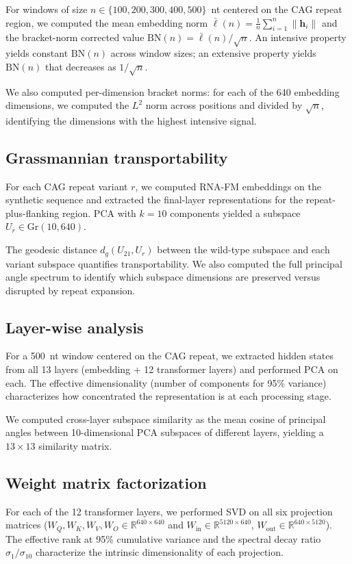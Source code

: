 \documentclass[11pt]{article}
\newcommand{\Gr}{\mathrm{Gr}}
\newcommand{\BN}{\mathrm{BN}}
\newcommand{\R}{\mathbb{R}}
\begin{document}
For windows of size $n \in \{100, 200, 300, 400, 500\}$~nt centered on
the CAG repeat region, we computed the mean embedding norm
$\bar{\ell}(n) = \frac{1}{n} \sum_{i=1}^{n} \|\mathbf{h}_i\|$
and the bracket-norm corrected value $\BN(n) = \bar{\ell}(n) / \sqrt{n}$.
%
An intensive property yields constant $\BN(n)$ across window sizes;
an extensive property yields $\BN(n)$ that decreases as $1/\sqrt{n}$.

We also computed per-dimension bracket norms: for each of the 640
embedding dimensions, we computed the $L^2$ norm across positions and
divided by $\sqrt{n}$, identifying the dimensions with the highest
intensive signal.

\subsection{Grassmannian transportability}

For each CAG repeat variant $r$, we computed RNA-FM embeddings on the
synthetic sequence and extracted the final-layer representations for
the repeat-plus-flanking region. PCA with $k = 10$ components yielded
a subspace $U_r \in \Gr(10, 640)$.

The geodesic distance $d_g(U_{21}, U_r)$ between the wild-type
subspace and each variant subspace quantifies transportability.
We also computed the full principal angle spectrum to identify which
subspace dimensions are preserved versus disrupted by repeat expansion.

\subsection{Layer-wise analysis}

For a 500~nt window centered on the CAG repeat, we extracted hidden
states from all 13 layers (embedding + 12 transformer layers) and
performed PCA on each. The effective dimensionality (number of
components for 95\% variance) characterizes how concentrated the
representation is at each processing stage.

We computed cross-layer subspace similarity as the mean cosine of
principal angles between 10-dimensional PCA subspaces of different
layers, yielding a $13 \times 13$ similarity matrix.

\subsection{Weight matrix factorization}

For each of the 12 transformer layers, we performed SVD on all six
projection matrices ($W_Q, W_K, W_V, W_O \in \R^{640 \times 640}$
and $W_{\mathrm{in}} \in \R^{5120 \times 640}$,
$W_{\mathrm{out}} \in \R^{640 \times 5120}$).
%
The effective rank at 95\% cumulative variance and the spectral decay
ratio $\sigma_1 / \sigma_{10}$ characterize the intrinsic
dimensionality of each projection.
\end{document}
